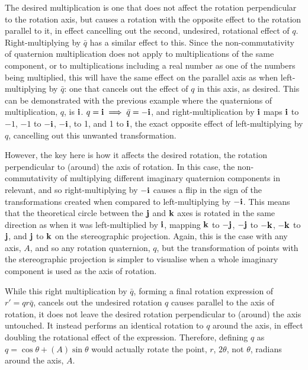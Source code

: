 \documentclass[10pt]{article}
\begin{document}
The desired multiplication is one that does not affect the rotation perpendicular to the rotation axis, but causes a rotation with the opposite effect to the rotation parallel to it, in effect cancelling out the second, undesired, rotational effect of $q$. Right-multiplying by $\bar{q}$ has a similar effect to this. Since the non-commutativity of quaternion multiplication does not apply to multiplications of the same component, or to multiplications including a real number as one of the numbers being multiplied, this will have the same effect on the parallel axis as when left-multiplying by $\bar{q}$: one that cancels out the effect of $q$ in this axis, as desired. This can be demonstrated with the previous example where the quaternions of multiplication, $q$, is $\vb{i}$. $q=\vb{i}\implies\bar{q}=-\vb{i}$, and right-multiplication by $\vb{i}$ maps $\vb{i}$ to $-1$, $-1$ to $-\vb{i}$, $-\vb{i}$, to 1, and 1 to $\vb{i}$, the exact opposite effect of left-multiplying by $q$, cancelling out this unwanted transformation.

However, the key here is how it affects the desired rotation, the rotation perpendicular to (around) the axis of rotation. In this case, the non-commutativity of multiplying different imaginary quaternion components in relevant, and so right-multiplying by $\vb{-i}$ causes a flip in the sign of the transformations created when compared to left-multiplying by $-\vb{i}$. This means that the theoretical circle between the $\vb{j}$ and $\vb{k}$ axes is rotated in the same direction as when it was left-multiplied by $\vb{i}$, mapping $\vb{k}$ to $-\vb{j}$, $-\vb{j}$ to $-\vb{k}$, $-\vb{k}$ to $\vb{j}$, and $\vb{j}$ to $\vb{k}$ on the stereographic projection. Again, this is the case with any axis, $A$, and so any rotation quaternion, $q$, but the transformation of points with the stereographic projection is simpler to visualise when a whole imaginary component is used as the axis of rotation.

While this right multiplication by $\bar{q}$, forming a final rotation expression of $r' = qr\bar{q}$, cancels out the undesired rotation $q$ causes parallel to the axis of rotation, it does not leave the desired rotation perpendicular to (around) the axis untouched. It instead performs an identical rotation to $q$ around the axis, in effect doubling the rotational effect of the expression. Therefore, defining $q$ as $q = \cos\theta + (A)\sin\theta$ would actually rotate the point, $r$, $2\theta$, not $\theta$, radians around the axis, $A$.
\end{document}
